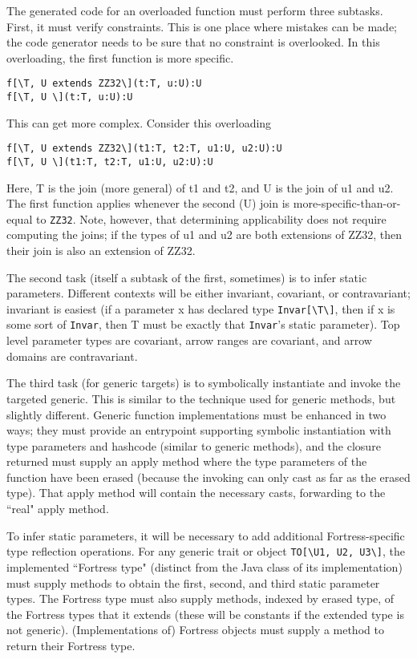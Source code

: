 \documentclass[11pt]{article}
\begin{document}
The generated code for an overloaded function must perform three subtasks.  First, it must verify constraints.  This is one place where mistakes can be made; the code generator needs to be sure that no constraint is overlooked.  In this overloading, the first function is more specific.  
\begin{verbatim}
f[\T, U extends ZZ32\](t:T, u:U):U
f[\T, U \](t:T, u:U):U
\end{verbatim}
This can get more complex.  Consider this overloading
\begin{verbatim}
f[\T, U extends ZZ32\](t1:T, t2:T, u1:U, u2:U):U
f[\T, U \](t1:T, t2:T, u1:U, u2:U):U
\end{verbatim}
Here, T is the join (more general) of t1 and t2, and U is the join of u1 and u2.  The first function applies whenever the second (U) join is more-specific-than-or-equal to \verb+ZZ32+.  Note, however, that determining applicability does not require computing the joins; if the types of u1 and u2 are both extensions of ZZ32, then their join is also an extension of ZZ32.

The second task (itself a subtask of the first, sometimes) is to infer static parameters.  Different contexts will be either invariant, covariant, or contravariant; invariant is easiest (if a parameter x has declared type \verb+Invar[\T\]+, then if x is some sort of \verb+Invar+, then T must be exactly that \verb+Invar+'s static parameter).  Top level parameter types are covariant, arrow ranges are covariant, and arrow domains are contravariant.

The third task (for generic targets) is to symbolically instantiate and invoke the targeted generic.  This is similar to the technique used for generic methods, but slightly different.  Generic function implementations must be enhanced in two ways; they must provide an entrypoint supporting symbolic instantiation with type parameters and hashcode (similar to generic methods), and the closure returned must supply an apply method where the type parameters of the function have been erased (because the invoking can only cast as far as the erased type).  That apply method will contain the necessary casts, forwarding to the ``real" apply method.

To infer static parameters, it will be necessary to add additional Fortress-specific type reflection operations.
For any generic trait or object \verb+TO[\U1, U2, U3\]+, the implemented ``Fortress type" (distinct from the Java class of its implementation) must supply methods to obtain the first, second, and third static parameter types.  The Fortress type must also supply methods, indexed by erased type, of the Fortress types that it extends (these will be constants if the extended type is not generic).  (Implementations of) Fortress objects must supply a method to return their Fortress type.
\end{document}

